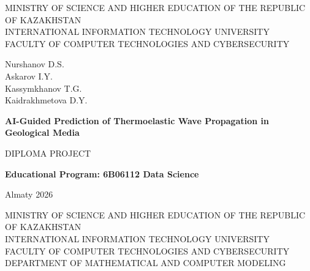 \thispagestyle{empty}

\begin{center}

{MINISTRY OF SCIENCE AND HIGHER EDUCATION OF THE REPUBLIC OF KAZAKHSTAN}\\
INTERNATIONAL INFORMATION TECHNOLOGY UNIVERSITY\\
FACULTY OF COMPUTER TECHNOLOGIES AND CYBERSECURITY

\vspace{35mm}

Nurshanov D.S.\\
Askarov I.Y.\\
Kassymkhanov T.G.\\
Kaidrakhmetova D.Y.

\vspace{15mm}
\textbf{AI-Guided Prediction of Thermoelastic Wave Propagation in Geological Media}

\vspace{10mm}
{DIPLOMA PROJECT}

\vspace{13mm}
\textbf{Educational Program: 6B06112  Data Science}

\vfill

{Almaty 2026}

\end{center}

\newpage
\thispagestyle{empty}

\begin{center}
{MINISTRY OF SCIENCE AND HIGHER EDUCATION OF THE REPUBLIC OF KAZAKHSTAN}\\
INTERNATIONAL INFORMATION TECHNOLOGY UNIVERSITY\\
FACULTY OF COMPUTER TECHNOLOGIES AND CYBERSECURITY\\
DEPARTMENT OF MATHEMATICAL AND COMPUTER MODELING
\end{center}

\vspace{4mm}


